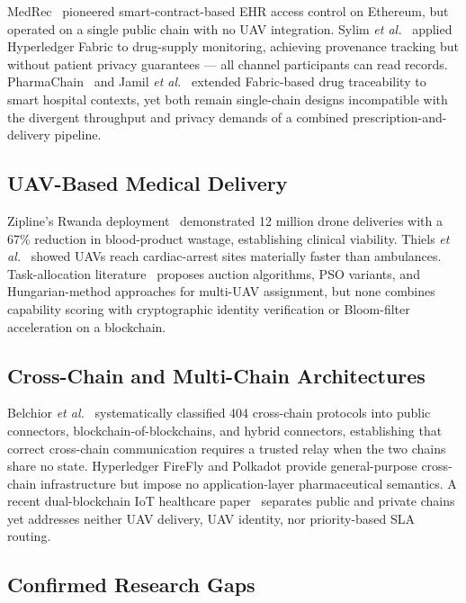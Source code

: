 \documentclass[sigplan,screen]{acmart}
\newcommand{\etal}{\textit{et al.}\xspace}
\begin{document}
MedRec~\cite{azaria2016medrec} pioneered smart-contract-based EHR access
control on Ethereum, but operated on a single public chain with no UAV
integration.
Sylim \etal~\cite{sylim2018blockchain} applied Hyperledger Fabric to
drug-supply monitoring, achieving provenance tracking but without patient
privacy guarantees — all channel participants can read records.
PharmaChain~\cite{pharmachain2023} and Jamil \etal~\cite{jamil2019novel}
extended Fabric-based drug traceability to smart hospital contexts, yet both
remain single-chain designs incompatible with the divergent throughput
and privacy demands of a combined prescription-and-delivery pipeline.

\subsection{UAV-Based Medical Delivery}

Zipline's Rwanda deployment~\cite{zipline2022lancet} demonstrated 12 million
drone deliveries with a 67\% reduction in blood-product wastage, establishing
clinical viability.
Thiels \etal~\cite{thiels2015uav} showed UAVs reach cardiac-arrest sites
materially faster than ambulances.
Task-allocation literature~\cite{skaltsis2023review} proposes auction
algorithms, PSO variants, and Hungarian-method approaches for multi-UAV
assignment, but none combines capability scoring with cryptographic
identity verification or Bloom-filter acceleration on a blockchain.

\subsection{Cross-Chain and Multi-Chain Architectures}

Belchior \etal~\cite{belchior2021survey} systematically classified 404
cross-chain protocols into public connectors, blockchain-of-blockchains, and
hybrid connectors, establishing that correct cross-chain communication requires
a trusted relay when the two chains share no state.
Hyperledger FireFly and Polkadot provide general-purpose cross-chain
infrastructure but impose no application-layer pharmaceutical semantics.
A recent dual-blockchain IoT healthcare paper~\cite{mallick2025dualchain}
separates public and private chains yet addresses neither UAV delivery, UAV
identity, nor priority-based SLA routing.

\subsection{Confirmed Research Gaps}
\label{subsec:gaps}
\end{document}
